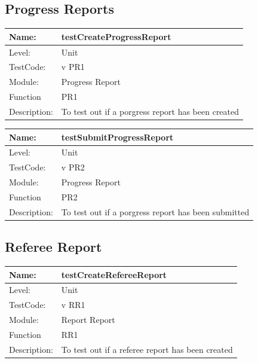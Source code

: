 \documentclass[12pt]{article}
\begin{document}
\begin{flushleft}
\begin{center}
\begin{tabular}{|l|p{12cm}|}
\end{tabular}
\end{center}
\subsection{Progress Reports}
\begin{center}
\begin{tabular}{|l|p{12cm}|}
\hline

 Name: & testCreateProgressReport \\
\hline
Level: & Unit \\
\hline
TestCode: & v PR1 \\
\hline
Module:& Progress Report\\
\hline
Function & PR1 \\
\hline
Description: & To test out if a porgress report has been created \\
\hline

\end{tabular}
\end{center}

\begin{center}
\begin{tabular}{|l|p{12cm}|}
\hline

 Name: & testSubmitProgressReport \\
\hline
Level: & Unit \\
\hline
TestCode: & v PR2 \\
\hline
Module:& Progress Report\\
\hline
Function & PR2 \\
\hline
Description: & To test out if a porgress report has been submitted \\
\hline

\end{tabular}
\end{center}

\subsection{Referee Report}
\begin{center}
\begin{tabular}{|l|p{12cm}|}
\hline

 Name: & testCreateRefereeReport \\
\hline
Level: & Unit \\
\hline
TestCode: & v RR1 \\
\hline
Module:& Report Report\\
\hline
Function & RR1 \\
\hline
Description: & To test out if a referee report has been created \\
\hline


\end{tabular}
\end{center}
\end{flushleft}
\end{document}
